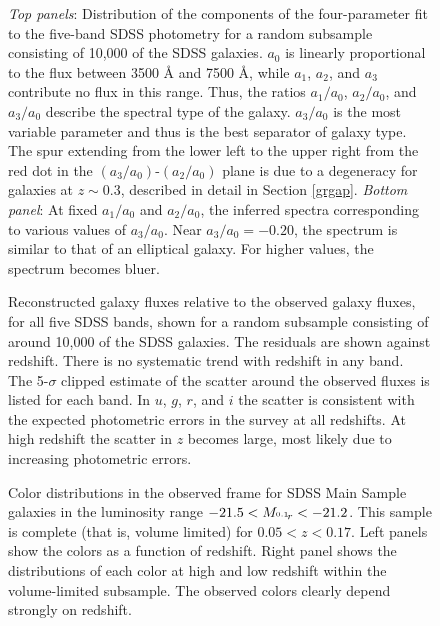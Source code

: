 \clearpage
{}
\begin{figure}
\figurenum{\fignum}
\caption{\label{k_coeffdist_plot} {\it Top panels}: Distribution of
the components of the four-parameter fit to the five-band SDSS
photometry for a random subsample consisting of 10,000 of the SDSS
galaxies. $a_0$ is linearly proportional to the flux between 3500 \AA
and 7500 \AA, while $a_1$, $a_2$, and $a_3$ contribute no flux in
this range. Thus, the ratios $a_1/a_0$, $a_2/a_0$, and $a_3/a_0$
describe the spectral type of the galaxy. $a_3/a_0$ is the most
variable parameter and thus is the best separator of galaxy
type. The spur extending from the lower left to the upper right from
the red dot in the $(a_3/a_0)$-$(a_2/a_0)$ plane is due to a
degeneracy for galaxies at $z\sim 0.3$, described in detail in Section
\ref{grgap}. {\it Bottom panel}: At fixed $a_1/a_0$ and $a_2/a_0$, the
inferred spectra corresponding to various values of $a_3/a_0$. Near
$a_3/a_0=-0.20$, the spectrum is similar to that of an elliptical
galaxy. For higher values, the spectrum becomes bluer. }
\end{figure}

\clearpage
{}
\begin{figure}
\figurenum{\fignum}
\caption{\label{k_model_plot} Reconstructed galaxy fluxes relative to
the observed galaxy fluxes, for all five SDSS bands, shown for a
random subsample consisting of around 10,000 of the SDSS galaxies. The
residuals are shown against redshift.  There is no systematic trend
with redshift in any band. The 5-$\sigma$ clipped estimate of the
scatter around the observed fluxes is listed for each band. In $u$,
$g$, $r$, and $i$ the scatter is consistent with the expected
photometric errors in the survey at all redshifts. At high redshift
the scatter in $z$ becomes large, most likely due to increasing
photometric errors. }
\end{figure}

\clearpage
{}
\begin{figure}
\figurenum{\fignum}
\caption{\label{main_colors_plot.z} Color distributions in the
observed frame for SDSS Main Sample galaxies in the luminosity range
$-21.5<M_{^{{0.1}}\!{r}}<-21.2$. This sample is complete (that is,
volume limited) for $0.05<z<0.17$. Left panels show the colors as a
function of redshift. Right panel shows the distributions of each
color at high and low redshift within the volume-limited
subsample. The observed colors clearly depend strongly on redshift.}
\end{figure}


